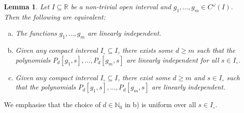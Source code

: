 \documentclass[reqno]{amsart}
\numberwithin{equation}{section}
\newcommand{\N}{\mathbb{N}}
\newcommand{\R}{\mathbb{R}}
\theoremstyle{plain}
\newtheorem{lemma}[theorem]{Lemma}
\theoremstyle{definition}
\begin{document}
\begin{lemma}\label{lem: linear ind} Let $I \subseteq \R$ be a non-trivial open interval and $g_1, \dots, g_m \in C^{\omega}(I)$. Then the following are equivalent:
\begin{enumerate}[a)]
    \item The functions $g_1,\dots, g_m$ are linearly independent.
    \item Given any compact interval $I_{\circ} \subseteq I$, there exists some $d \geq m$ such that the polynomials $P_d[g_1,s], \ldots, P_d[g_m,s]$ are linearly independent for all $s \in I_{\circ}$.
    \item Given any compact interval $I_{\circ} \subseteq I$, there exist some $d \geq m$ and $s \in I_{\circ}$ such that the polynomials $P_d[g_1,s], \ldots, P_d[g_m,s]$ are linearly independent.
\end{enumerate} 
\end{lemma}

We emphasise that the choice of $d \in \N_0$ in b) is uniform over all $s \in I_{\circ}$. 
\end{document}
